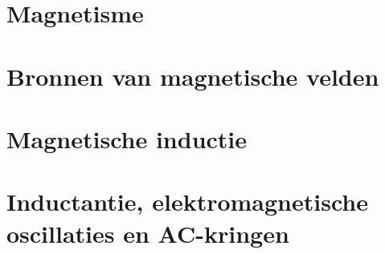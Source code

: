 \section{Magnetisme}

\vspace{0.5cm}



\newpage

\section{Bronnen van magnetische velden}

\vspace{0.5cm}



\newpage

\section{Magnetische inductie}

\vspace{0.5cm}



\newpage

\section{Inductantie, elektromagnetische oscillaties en AC-kringen}

\vspace{0.5cm}


